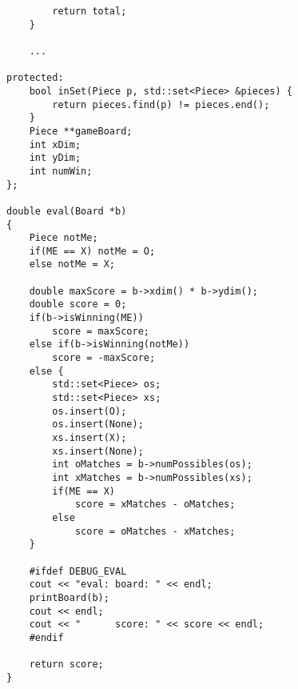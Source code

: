 \documentclass[10pt]{article}
\begin{document}
\begin{verbatim}
        return total;
    }
    
    ...

protected:
    bool inSet(Piece p, std::set<Piece> &pieces) {
        return pieces.find(p) != pieces.end();
    }
    Piece **gameBoard;
    int xDim;
    int yDim;
    int numWin;
};

double eval(Board *b)
{
    Piece notMe;
    if(ME == X) notMe = O;
    else notMe = X;

    double maxScore = b->xdim() * b->ydim();
    double score = 0;
    if(b->isWinning(ME))
        score = maxScore;
    else if(b->isWinning(notMe))
        score = -maxScore;
    else {
        std::set<Piece> os;
        std::set<Piece> xs;
        os.insert(O);
        os.insert(None);
        xs.insert(X);
        xs.insert(None);
        int oMatches = b->numPossibles(os);
        int xMatches = b->numPossibles(xs);
        if(ME == X)
            score = xMatches - oMatches;
        else
            score = oMatches - xMatches;
    }

    #ifdef DEBUG_EVAL
    cout << "eval: board: " << endl;
    printBoard(b);
    cout << endl;
    cout << "      score: " << score << endl;
    #endif

    return score;
}
\end{verbatim}
\end{document}
